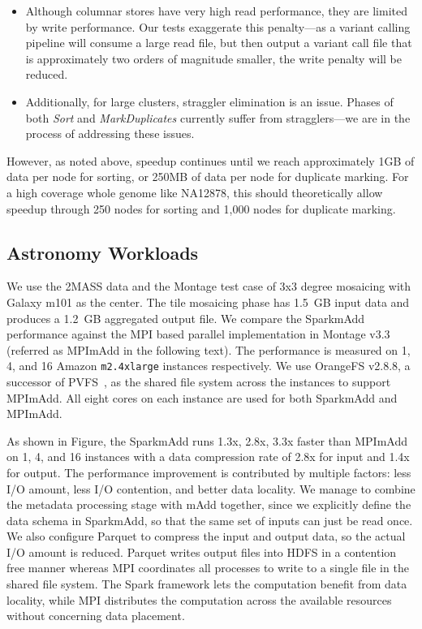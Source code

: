 \documentclass{acm_proc_article-sp}
\begin{document}
\begin{itemize}
\item Although columnar stores have very high read performance, they are limited by write performance.
Our tests exaggerate this penalty---as a variant calling pipeline will consume a large read file, but then
output a variant call file that is approximately two orders of magnitude smaller, the write penalty will be
reduced.
\item Additionally, for large clusters, straggler elimination is an issue. Phases of both \textit{Sort} and
\textit{MarkDuplicates} currently suffer from stragglers---we are in the process of addressing these
issues.
\end{itemize}

However, as noted above, speedup continues until we reach approximately 1GB of data per node for
sorting, or 250MB of data per node for duplicate marking. For a high coverage whole genome like
NA12878, this should theoretically allow speedup through 250 nodes for sorting and 1,000 nodes for
duplicate marking.

\subsection{Astronomy Workloads}
\label{sec:astro-workloads}

We use the 2MASS data and the Montage test case of 3x3 degree mosaicing with Galaxy m101 as the center. 
The tile mosaicing phase has 1.5~GB input data and produces a 1.2~GB aggregated output file. 
We compare the SparkmAdd performance against the MPI based parallel implementation in Montage v3.3 (referred as MPImAdd in the following text).
The performance is measured on 1, 4, and 16 Amazon {\tt m2.4xlarge} instances respectively.
We use OrangeFS v2.8.8, a successor of PVFS~\cite{PVFS}, as the shared file system across the instances to support MPImAdd.
All eight cores on each instance are used for both SparkmAdd and MPImAdd.

As shown in Figure, the SparkmAdd runs 1.3x, 2.8x, 3.3x faster than MPImAdd on 1, 4, and 16 instances with a data compression rate of 2.8x for input and 1.4x for output. The performance improvement is contributed by multiple factors: less I/O amount, less I/O contention, and better data locality. We manage to combine the metadata processing stage with mAdd together, since we explicitly define the data schema in SparkmAdd, so that the same set of inputs can just be read once. We also configure Parquet to compress the input and output data, so the actual I/O amount is reduced. Parquet writes output files into HDFS in a contention free manner whereas MPI coordinates all processes to write to a single file in the shared file system. The Spark framework lets the computation benefit from data locality, while MPI distributes the computation across the available resources without concerning data placement.
\end{document}
